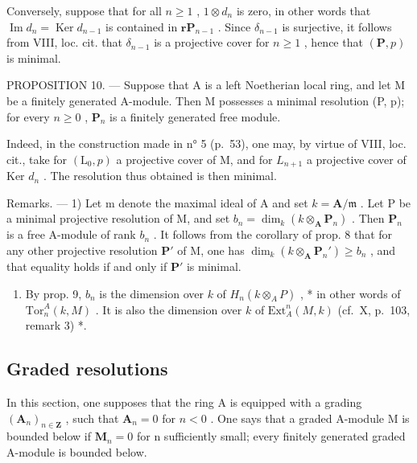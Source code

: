 Conversely, suppose that for all \(n \geqslant 1\) , \(1 \otimes d_n\) is zero, in other words that \(\operatorname{Im} d_n = \operatorname{Ker} d_{n-1}\) is contained in \(\mathbf{rP}_{n-1}\) . Since \(\delta_{n-1}\) is surjective, it follows from VIII, loc. cit. that \(\delta_{n-1}\) is a projective cover for \(n \geqslant 1\) , hence that \((\mathbf{P}, p)\) is minimal.

PROPOSITION 10. --- Suppose that A is a left Noetherian local ring, and let M be a finitely generated A-module. Then M possesses a minimal resolution (P, p); for every \(n \geqslant 0\) , \(\mathbf{P}_{n}\) is a finitely generated free module.

Indeed, in the construction made in n° 5 (p.~53), one may, by virtue of VIII, loc. cit., take for \((\mathrm{L}_{0}, p)\) a projective cover of M, and for \(L_{n+1}\) a projective cover of Ker \(d_{n}\) . The resolution thus obtained is then minimal.

Remarks. --- 1) Let m denote the maximal ideal of A and set \(k = \mathbf{A}/\mathfrak{m}\) . Let P be a minimal projective resolution of M, and set \(b_{n} = \dim_{k}(k \otimes_{\mathbf{A}} \mathbf{P}_{n})\) . Then \(\mathbf{P}_{n}\) is a free A-module of rank \(b_{n}\) . It follows from the corollary of prop. 8 that for any other projective resolution \(\mathbf{P}'\) of M, one has \(\dim_{k}(k \otimes_{\mathbf{A}} \mathbf{P}_{n}') \geqslant b_{n}\) , and that equality holds if and only if \(\mathbf{P}'\) is minimal.

\begin{enumerate}
\def\labelenumi{\arabic{enumi})}
\setcounter{enumi}{1}
\tightlist
\item
  By prop. 9, \(b_n\) is the dimension over \(k\) of \(H_n(k \otimes_A P)\) , * in other words of \(\text{Tor}_n^A(k, M)\) . It is also the dimension over \(k\) of \(\text{Ext}_A^n(M, k)\) (cf.~X, p.~103, remark 3) *.
\end{enumerate}

\subsection{Graded resolutions}

In this section, one supposes that the ring A is equipped with a grading \((\mathbf{A}_n)_{n\in \mathbf{Z}}\) , such that \(\mathbf{A}_n = 0\) for \(n < 0\) . One says that a graded A-module M is bounded below if \(\mathbf{M}_n = 0\) for n sufficiently small; every finitely generated graded A-module is bounded below.


